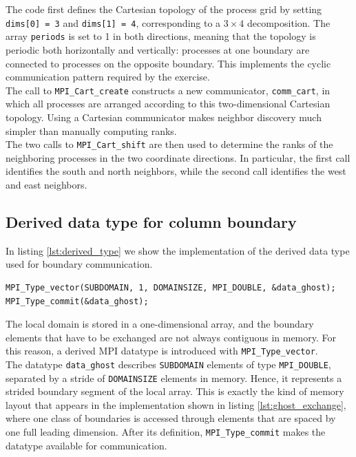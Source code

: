 \documentclass[unicode,10pt,a4paper,oneside,numbers=endperiod,openany]{scrartcl}
\begin{document}
The code first defines the Cartesian topology of the process grid by setting
\texttt{dims[0] = 3} and \texttt{dims[1] = 4}, corresponding to a $3 \times 4$
decomposition. The array \texttt{periods} is set to 1 in both directions, meaning that the topology is periodic both horizontally and vertically: processes at one boundary are connected to processes on the opposite boundary. This implements the cyclic communication pattern required by the exercise.\\

The call to \texttt{MPI\_Cart\_create} constructs a new communicator, \texttt{comm\_cart}, in which all processes are arranged according to this two-dimensional Cartesian topology. Using a Cartesian communicator makes neighbor discovery much simpler than manually computing ranks.\\

The two calls to \texttt{MPI\_Cart\_shift} are then used to determine the ranks of the neighboring processes in the two coordinate directions. In particular, the first call identifies the south and north neighbors, while the second call identifies the west and east neighbors.

\subsection{Derived data type for column boundary}
In listing \ref{lst:derived_type} we show the implementation of the derived data type used for boundary communication.
\begin{lstlisting}[style=grayverbatim, caption={Derived data type for column boundary using MPI}, label={lst:derived_type}]
MPI_Type_vector(SUBDOMAIN, 1, DOMAINSIZE, MPI_DOUBLE, &data_ghost);
MPI_Type_commit(&data_ghost);
\end{lstlisting}

The local domain is stored in a one-dimensional array, and the boundary elements that have to be exchanged are not always contiguous in memory. For this reason, a derived MPI datatype is introduced with \texttt{MPI\_Type\_vector}.\\

The datatype \texttt{data\_ghost} describes \texttt{SUBDOMAIN} elements of type \texttt{MPI\_DOUBLE}, separated by a stride of \texttt{DOMAINSIZE} elements in memory. Hence, it represents a strided boundary segment of the local array. This is exactly the kind of memory layout that appears in the implementation shown in listing \ref{lst:ghost_exchange}, where one class of boundaries is accessed through elements that are spaced by one full leading dimension. After its definition, \texttt{MPI\_Type\_commit} makes the datatype available for communication.\\
\end{document}
